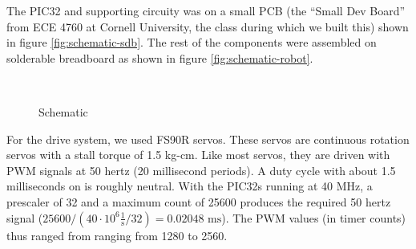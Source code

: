 \documentclass[]{article}
\begin{document}
The PIC32 and supporting circuity was on a small PCB (the ``Small Dev Board'' from ECE 4760 at Cornell University, the class during which we built this) shown in figure \ref{fig:schematic-sdb}. The rest of the components were assembled on solderable breadboard as shown in figure \ref{fig:schematic-robot}.

\begin{figure}
  \centering
  \\
  \caption{Schematic}
  \label{fig:schematic}
\end{figure}


For the drive system, we used FS90R servos.
These servos are continuous rotation servos with a stall torque of 1.5 kg-cm.
Like most servos, they are driven with PWM signals at 50 hertz (20 millisecond periods).
A duty cycle with about 1.5 milliseconds on is roughly neutral.
With the PIC32s running at 40 MHz, a prescaler of 32 and a maximum count of 25600 produces the required 50 hertz signal ($25600/\left(40\cdot 10^6 \frac{1}{\text{s}}/ 32 \right) = 0.02048 \text{ ms}$).
The PWM values (in timer counts) thus ranged from ranging from 1280 to 2560.
\end{document}
